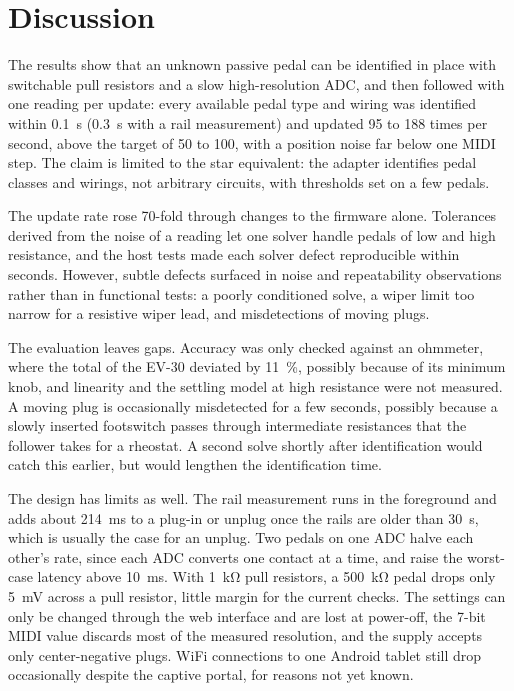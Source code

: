 
\chapter{Discussion}
\label{ch:discussion}

The results show that an unknown passive pedal can be identified in place with switchable pull resistors and a slow high-resolution ADC, and then followed with one reading per update: every available pedal type and wiring was identified within \qty{0.1}{\second} (\qty{0.3}{\second} with a rail measurement) and updated 95 to 188 times per second, above the target of 50 to 100, with a position noise far below one MIDI step. The claim is limited to the star equivalent: the adapter identifies pedal classes and wirings, not arbitrary circuits, with thresholds set on a few pedals.

The update rate rose 70-fold through changes to the firmware alone. Tolerances derived from the noise of a reading let one solver handle pedals of low and high resistance, and the host tests made each solver defect reproducible within seconds. However, subtle defects surfaced in noise and repeatability observations rather than in functional tests: a poorly conditioned solve, a wiper limit too narrow for a resistive wiper lead, and misdetections of moving plugs.

The evaluation leaves gaps. Accuracy was only checked against an ohmmeter, where the total of the EV-30 deviated by \qty{11}{\percent}, possibly because of its minimum knob, and linearity and the settling model at high resistance were not measured. A moving plug is occasionally misdetected for a few seconds, possibly because a slowly inserted footswitch passes through intermediate resistances that the follower takes for a rheostat. A second solve shortly after identification would catch this earlier, but would lengthen the identification time.

The design has limits as well. The rail measurement runs in the foreground and adds about \qty{214}{\milli\second} to a plug-in or unplug once the rails are older than \qty{30}{\second}, which is usually the case for an unplug. Two pedals on one ADC halve each other's rate, since each ADC converts one contact at a time, and raise the worst-case latency above \qty{10}{\milli\second}. With \qty{1}{\kilo\ohm} pull resistors, a \qty{500}{\kilo\ohm} pedal drops only \qty{5}{\milli\volt} across a pull resistor, little margin for the current checks. The settings can only be changed through the web interface and are lost at power-off, the 7-bit MIDI value discards most of the measured resolution, and the supply accepts only center-negative plugs. WiFi connections to one Android tablet still drop occasionally despite the captive portal, for reasons not yet known.
